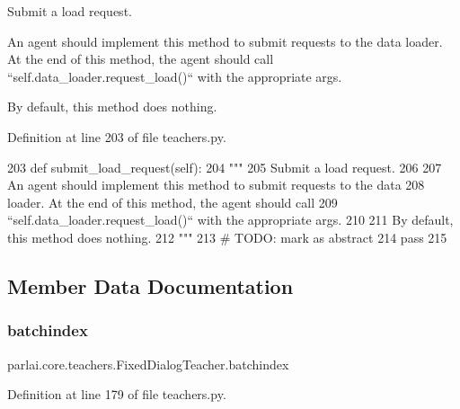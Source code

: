 \begin{DoxyVerb}Submit a load request.

An agent should implement this method to submit requests to the data
loader. At the end of this method, the agent should call
``self.data_loader.request_load()`` with the appropriate args.

By default, this method does nothing.
\end{DoxyVerb}
 

Definition at line 203 of file teachers.\+py.


\begin{DoxyCode}
203     \textcolor{keyword}{def }submit\_load\_request(self):
204         \textcolor{stringliteral}{"""}
205 \textcolor{stringliteral}{        Submit a load request.}
206 \textcolor{stringliteral}{}
207 \textcolor{stringliteral}{        An agent should implement this method to submit requests to the data}
208 \textcolor{stringliteral}{        loader. At the end of this method, the agent should call}
209 \textcolor{stringliteral}{        ``self.data\_loader.request\_load()`` with the appropriate args.}
210 \textcolor{stringliteral}{}
211 \textcolor{stringliteral}{        By default, this method does nothing.}
212 \textcolor{stringliteral}{        """}
213         \textcolor{comment}{# TODO: mark as abstract}
214         \textcolor{keywordflow}{pass}
215 
\end{DoxyCode}


\subsection{Member Data Documentation}
\mbox{\label{classparlai_1_1core_1_1teachers_1_1FixedDialogTeacher_a468d55710137a42b18f85212d7068c47}} 
\subsubsection{\texorpdfstring{batchindex}{batchindex}}
{\footnotesize\ttfamily parlai.\+core.\+teachers.\+Fixed\+Dialog\+Teacher.\+batchindex}



Definition at line 179 of file teachers.\+py.

